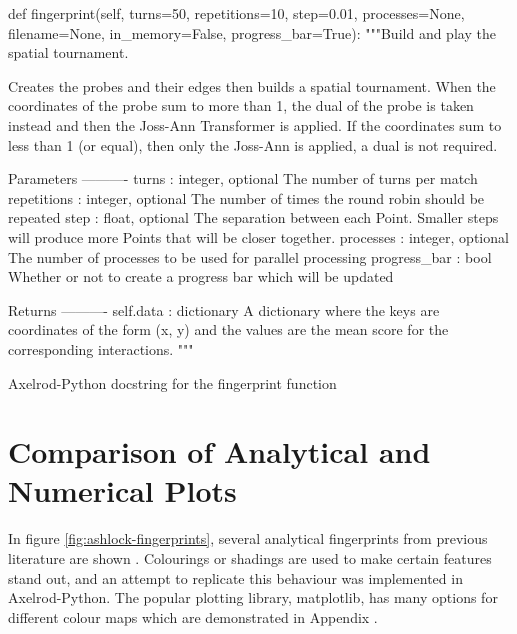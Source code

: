 \begin{listing}[hbtp!]
\begin{SourceCode}
def fingerprint(self, turns=50, repetitions=10, step=0.01, processes=None,
                filename=None, in_memory=False, progress_bar=True):
    """Build and play the spatial tournament.

    Creates the probes and their edges then builds a spatial tournament.
    When the coordinates of the probe sum to more than 1, the dual of the
    probe is taken instead and then the Joss-Ann Transformer is applied. If
    the coordinates sum to less than 1 (or equal), then only the Joss-Ann is
    applied, a dual is not required.

    Parameters
    ----------
    turns : integer, optional
        The number of turns per match
    repetitions : integer, optional
        The number of times the round robin should be repeated
    step : float, optional
        The separation between each Point. Smaller steps will
        produce more Points that will be closer together.
    processes : integer, optional
        The number of processes to be used for parallel processing
    progress_bar : bool
        Whether or not to create a progress bar which will be updated

    Returns
    ----------
    self.data : dictionary
        A dictionary where the keys are coordinates of the form (x, y) and
        the values are the mean score for the corresponding interactions.
    """
\end{SourceCode}
\caption{Axelrod-Python docstring for the fingerprint function}
\label{lst:fingerprint-docstring}
\end{listing}


\section{Comparison of Analytical and Numerical Plots}

In figure \ref{fig:ashlock-fingerprints}, several analytical fingerprints from previous literature are shown \cite{Ashlock2004, Ashlock2008}.
Colourings or shadings are used to make certain features stand out, and an attempt to replicate this behaviour was implemented in Axelrod-Python.
The popular plotting library, matplotlib, has many options for different colour maps which are demonstrated in Appendix . %

